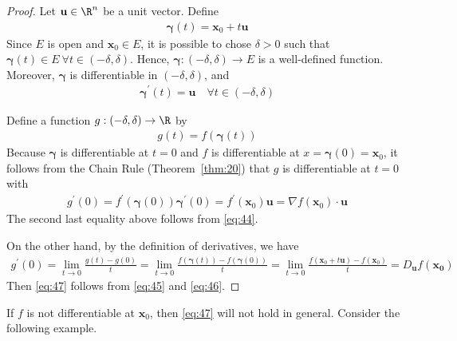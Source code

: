 \documentclass[thmcnt=section, 12pt]{elegantbook}
\begin{document}
\begin{proof}
    Let $\mathbf{u} \in \R^n$ be a unit vector. Define
    \begin{align*}
        \boldsymbol{\gamma}(t)
        = \mathbf{x}_0 + t \mathbf{u}
    \end{align*}
    Since $E$ is open and $\mathbf{x}_0 \in E$, it is possible to chose $\delta > 0$ such that $\boldsymbol{\gamma}(t) \in E \ \forall t \in (-\delta,\delta)$. Hence, $\boldsymbol{\gamma}: (-\delta,\delta) \to E$ is a well-defined function. Moreover, $\boldsymbol{\gamma}$ is differentiable in $(-\delta, \delta)$, and 
    \begin{align}
        \boldsymbol{\gamma}^\prime(t) = \mathbf{u}
        \quad \forall t \in (-\delta, \delta)
        \label{eq:44}
    \end{align}
    
    \par Define a function $g: (-\delta, \delta) \to \R$ by 
    \begin{align*}
        g(t) = f(\boldsymbol{\gamma}(t))
    \end{align*}
    Because $\boldsymbol{\gamma}$ is differentiable at $t = 0$ and $f$ is differentiable at $x = \boldsymbol{\gamma}(0) = \mathbf{x}_0$, it follows from the Chain Rule (Theorem~\ref{thm:20}) that $g$ is differentiable at $t = 0$ with 
    \begin{align}
        g^\prime(0) = f^\prime(\boldsymbol{\gamma}(0)) \boldsymbol{\gamma}^\prime(0)
        = f^\prime(\mathbf{x}_0) \mathbf{u}
        = \nabla f (\mathbf{x}_0) \cdot \mathbf{u}
        \label{eq:45}
    \end{align}
    The second last equality above follows from \eqref{eq:44}.

    \par On the other hand, by the definition of derivatives, we have 
    \begin{align}
        g^\prime(0) 
        = \lim_{t \to 0} \frac{g(t) - g(0)}{t}
        = \lim_{t \to 0} \frac{f(\boldsymbol{\gamma}(t)) - f(\boldsymbol{\gamma}(0))}{t}
        = \lim_{t \to 0} \frac{f(\mathbf{x}_0 + t \mathbf{u}) - f(\mathbf{x}_0)}{t}
        = D_{\mathbf{u}}f (\mathbf{x_0})
        \label{eq:46}
    \end{align}
    Then \eqref{eq:47} follows from \eqref{eq:45} and \eqref{eq:46}.
\end{proof}


\par If $f$ is not differentiable at $\mathbf{x}_0$, then \eqref{eq:47} will not hold in general. Consider the following example.
\end{document}
